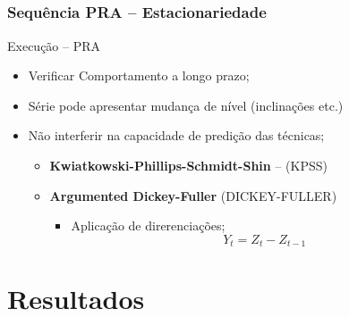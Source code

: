 \documentclass[aspectratio=169]{beamer}
\begin{document}
\subsection{}
\begin{frame}
\frametitle{Sequência PRA -- Estacionariedade}
\begin{block}{Execução -- PRA}
    \begin{itemize}
        \item Verificar Comportamento a longo prazo;
        \item Série pode apresentar mudança de nível (inclinações etc.)
        \item Não interferir na capacidade de predição das técnicas;
            \begin{itemize}[triangle]
                \item \textbf{Kwiatkowski-Phillips-Schmidt-Shin} -- (KPSS)
                \item \textbf{Argumented Dickey-Fuller} (DICKEY-FULLER)
                    \begin{itemize}[square]
                    \item Aplicação de direrenciações;
                        \begin{equation}
                             Y_{t} = Z_{t} - Z_{t-1}
                         \end{equation}
                    \end{itemize}
            \end{itemize}
        \end{itemize}
\end{block}
\end{frame}

\section{Resultados}

\end{document}
